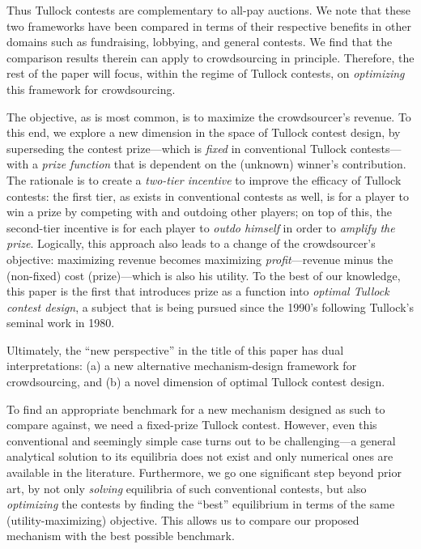 \documentclass{sig-alternate-10pt}
\begin{document}
Thus Tullock contests are complementary to all-pay auctions. We note that these two frameworks have been compared in terms of their respective benefits in other domains such as fundraising\cite{allpay-lot-wp13}, lobbying\cite{Fang02lot}, and general contests\cite{lottery13apa}. We find that the comparison results therein can apply to crowdsourcing in principle. Therefore, the rest of the paper will focus, within the regime of Tullock contests, on {\em optimizing} this framework for crowdsourcing.

The objective, as is most common, is to maximize the crowdsourcer's revenue. To this end, we explore a new dimension in the space of Tullock contest design, by superseding the contest prize---which is {\em fixed} in conventional Tullock contests---with a {\em prize function} that is dependent on the (unknown) winner's contribution.  The rationale is to create a {\em two-tier incentive} to improve the efficacy of Tullock contests: the first tier, as exists in conventional contests as well, is for a player to win a prize by competing with and outdoing other players; on top of this, the second-tier incentive is for each player to {\em outdo himself} in order to {\em amplify the prize}. Logically, this approach also leads to a change of the crowdsourcer's objective: maximizing revenue becomes maximizing {\em profit}---revenue minus the (non-fixed) cost (prize)---which is also his utility. To the best of our knowledge, this paper is the first that introduces prize as a function into {\em optimal Tullock contest design}, a subject that is being pursued since the 1990's\cite{optlot91} following Tullock's seminal work\cite{Tullock80} in 1980.

Ultimately, the ``new perspective'' in the title of this paper has dual interpretations: (a) a new alternative mechanism-design framework for crowdsourcing, and (b) a novel dimension of optimal Tullock contest design.

To find an appropriate benchmark for a new mechanism designed as such to compare against, we need a fixed-prize Tullock contest. However, even this conventional and seemingly simple case turns out to be challenging---a general analytical solution to its equilibria does not exist and only numerical ones are available in the literature\cite{Fey08,Ryvkin10,Wasser13}.  Furthermore, we go one significant step beyond prior art, by not only {\em solving} equilibria of such conventional contests, but also {\em optimizing} the contests by finding the ``best'' equilibrium in terms of the same (utility-maximizing) objective. This allows us to compare our proposed mechanism with the best possible benchmark.
\end{document}
